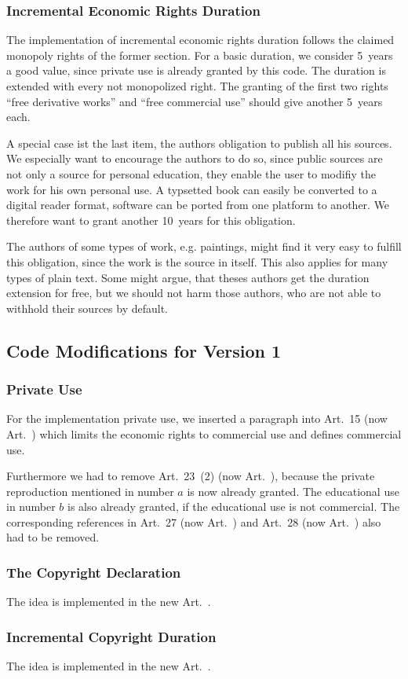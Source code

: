 \subsubsection{Incremental Economic Rights Duration}

The implementation of incremental economic rights duration follows the claimed monopoly rights of the former section. For a basic duration, we consider 5~years a good value, since private use is already granted by this code. The duration is extended with every not monopolized right. The granting of the first two rights ``free derivative works'' and ``free commercial use'' should give another 5~years each.

A special case ist the last item, the authors obligation to publish all his sources. We especially want to encourage the authors to do so, since public sources are not only a source for personal education, they enable the user to modifiy the work for his own personal use. A typsetted book can easily be converted to a digital reader format, software can be ported from one platform to another. We therefore want to grant another 10~years for this obligation.

The authors of some types of work, e.g. paintings, might find it very easy to fulfill this obligation, since the work is the source in itself. This also applies for many types of plain text. Some might argue, that theses authors get the duration extension for free, but we should not harm those authors, who are not able to withhold their sources by default.

\subsection{Code Modifications for Version 1}

\subsubsection{Private Use}

For the implementation private use, we inserted a paragraph into Art.~15 (now Art.~) which limits the economic rights to commercial use and defines commercial use.

Furthermore we had to remove Art.~23~(2) (now Art.~), because the private reproduction mentioned in number $a$ is now already granted. The educational use in number $b$ is also already granted, if the educational use is not commercial. The corresponding references in Art.~27 (now Art.~) and Art.~28 (now Art.~) also had to be removed.

\subsubsection{The Copyright Declaration}

The idea is implemented in the new Art.~.

\subsubsection{Incremental Copyright Duration}

The idea is implemented in the new Art.~.

